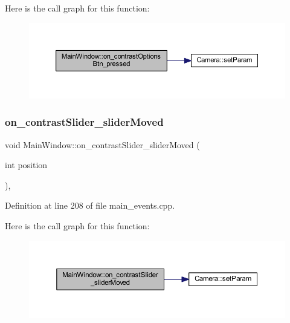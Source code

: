 Here is the call graph for this function\+:
\nopagebreak
\begin{figure}[H]
\begin{center}
\leavevmode
\includegraphics[width=350pt]{class_main_window_a803bb81c63591b7f6c3306f712438378_cgraph}
\end{center}
\end{figure}
\mbox{\label{class_main_window_ac9e59c581b41ab29cd61b41447cb74ef}} 
\subsubsection{\texorpdfstring{on\_contrastSlider\_sliderMoved}{on\_contrastSlider\_sliderMoved}}
{\footnotesize\ttfamily void Main\+Window\+::on\+\_\+contrast\+Slider\+\_\+slider\+Moved (\begin{DoxyParamCaption}\item[{int}]{position }\end{DoxyParamCaption})\hspace{0.3cm}{\ttfamily [private]}, {\ttfamily [slot]}}



Definition at line 208 of file main\+\_\+events.\+cpp.

Here is the call graph for this function\+:
\nopagebreak
\begin{figure}[H]
\begin{center}
\leavevmode
\includegraphics[width=350pt]{class_main_window_ac9e59c581b41ab29cd61b41447cb74ef_cgraph}
\end{center}
\end{figure}
\mbox{\label{class_main_window_ab98ee5c1e01d4db75d27e3f00c7c4b78}} 
